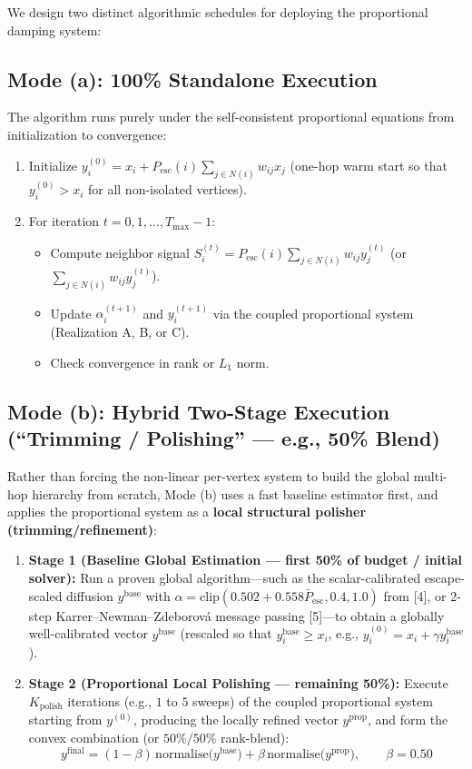 \documentclass[11pt, a4paper]{article}
\begin{document}
We design two distinct algorithmic schedules for deploying the proportional damping system:

\subsection{Mode (a): 100\% Standalone Execution}
The algorithm runs purely under the self-consistent proportional equations from initialization to convergence:
\begin{enumerate}
    \item Initialize $y_i^{(0)} = x_i + P_{\mathrm{esc}}(i) \sum_{j \in N(i)} w_{ij} x_j$ (one-hop warm start so that $y_i^{(0)} > x_i$ for all non-isolated vertices).
    \item For iteration $t = 0, 1, \dots, T_{\max} - 1$:
    \begin{itemize}
        \item Compute neighbor signal $S_i^{(t)} = P_{\mathrm{esc}}(i) \sum_{j \in N(i)} w_{ij} y_j^{(t)}$ (or $\sum_{j \in N(i)} w_{ij} y_j^{(t)}$).
        \item Update $\alpha_i^{(t+1)}$ and $y_i^{(t+1)}$ via the coupled proportional system (Realization A, B, or C).
        \item Check convergence in rank or $L_1$ norm.
    \end{itemize}
\end{enumerate}

\subsection{Mode (b): Hybrid Two-Stage Execution (``Trimming / Polishing'' --- e.g., 50\% Blend)}
Rather than forcing the non-linear per-vertex system to build the global multi-hop hierarchy from scratch, Mode (b) uses a fast baseline estimator first, and applies the proportional system as a \textbf{local structural polisher (trimming/refinement)}:
\begin{enumerate}
    \item \textbf{Stage 1 (Baseline Global Estimation --- first 50\% of budget / initial solver):} Run a proven global algorithm---such as the scalar-calibrated escape-scaled diffusion $y^{\mathrm{base}}$ with $\alpha = \mathrm{clip}(0.502 + 0.558 \bar{P}_{\mathrm{esc}}, 0.4, 1.0)$ from [4], or 2-step Karrer--Newman--Zdeborov\'{a} message passing [5]---to obtain a globally well-calibrated vector $y^{\mathrm{base}}$ (rescaled so that $y_i^{\mathrm{base}} \ge x_i$, e.g., $y_i^{(0)} = x_i + \gamma y_i^{\mathrm{base}}$).
    \item \textbf{Stage 2 (Proportional Local Polishing --- remaining 50\%):} Execute $K_{\mathrm{polish}}$ iterations (e.g., $1$ to $5$ sweeps) of the coupled proportional system starting from $y^{(0)}$, producing the locally refined vector $y^{\mathrm{prop}}$, and form the convex combination (or $50\% / 50\%$ rank-blend):
    \[
    y^{\mathrm{final}} = (1 - \beta)\, \mathrm{normalise}\big(y^{\mathrm{base}}\big) + \beta\, \mathrm{normalise}\big(y^{\mathrm{prop}}\big), \qquad \beta = 0.50
    \]
\end{enumerate}
\end{document}
